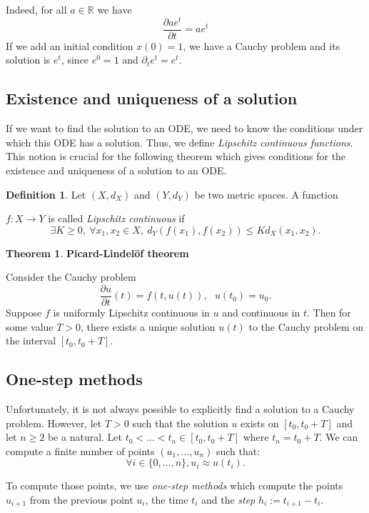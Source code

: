 \documentclass[10pt,a4paper]{article}
\theoremstyle{definition}
\newtheorem{definition}{Definition}
\theoremstyle{definition}
\newtheorem{theorem}{Theorem}
\theoremstyle{definition}
\begin{document}
Indeed, for all $a \in \mathbb{R}$ we have
$$
\frac{\partial ae^t}{\partial t} = ae^t
$$
If we add an initial condition $x(0) = 1$, we have a Cauchy problem and its solution is $e^t$, since $e^0 = 1$ and $\partial_te^t = e^t$.

\subsection{Existence and uniqueness of a solution} \label{exiunique}

If we want to find the solution to an ODE, we need to know the conditions under which this ODE has a solution. Thus, we define \textit{Lipschitz continuous functions}. This notion is crucial for the following theorem which gives conditions for the existence and uniqueness of a solution to an ODE.

\begin{definition}
Let $(X, d_X)$ and $(Y, d_Y)$ be two metric spaces.  
A function 

\noindent $f: X \rightarrow  Y$ is called \textit{Lipschitz continuous} if
$$
\exists K \geq 0, \  \forall x_1, x_2 \in X, \  d_Y(f(x_1), f(x_2)) \leq Kd_X(x_1, x_2).
$$
\end{definition}

\begin{theorem}{\textbf{Picard-Lindelöf theorem}}

Consider the Cauchy problem
$$
\frac{\partial u}{\partial t} (t) = f(t, u(t)), \ \ \ u(t_0) = u_0.
$$
Suppose $f$ is uniformly Lipschitz continuous in $u$ and continuous in $t$. Then for some value $T > 0$, there exists a unique solution $u(t)$ to the Cauchy problem on the interval $[t_0, t_0 + T]$. 
\end{theorem}

\subsection{One-step methods}
Unfortunately, it is not always possible to explicitly find a solution to a Cauchy problem. However, let $T > 0$ such that the solution $u$ exists on $[t_0, t_0 + T]$ and let $n \geqslant 2$ be a natural. Let  $t_0 < ... < t_n \in [t_0, t_0 + T]$ where $t_n = t_0 + T$. We can compute a finite number of points $(u_1, \dots, u_n)$ such that:
$$
\forall i\in \{0,\dots, n\},  u_i \approx u(t_i).
$$

To compute those points, we use \textit{one-step methods} which compute the points $u_{i+1}$ from the previous point $u_i$, the time $t_i$ and the \textit{step} $h_i := t_{i+1} - t_i$.
\end{document}
